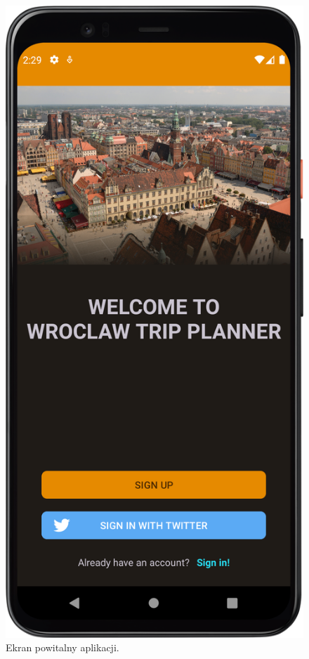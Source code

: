         \begin{figure}[!ht]%
            \centering
            \includegraphics[scale=0.09]{src/app/welcome_fragment.png}
            \caption{Ekran powitalny aplikacji.\label{welcome}}
            \qquad
        \end{figure} 

